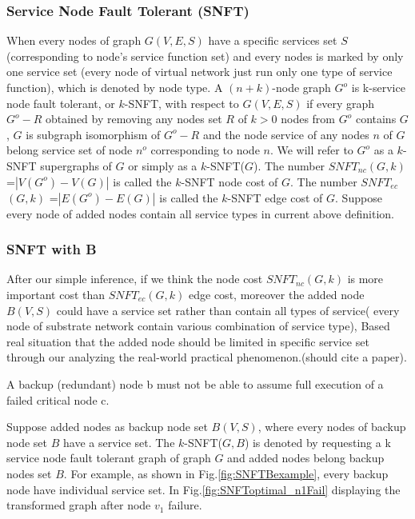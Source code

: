 \subsubsection{Service Node Fault Tolerant (SNFT)}
When every nodes of graph $G(V,E,S)$ have a specific services set $S$ (corresponding to node's service function set) and every nodes is marked by only one service set (every node of virtual network just run only one type of service function), which is denoted by node type. A $(n+k)$-node graph $G^o$ is k-service node fault tolerant, or $k$-SNFT, with respect to $G(V,E,S)$ if every graph $G^o-R$ obtained by removing any nodes set $R$ of $k>0$ nodes from $G^o$ contains $G$, $G$ is subgraph isomorphism of $G^o-R$ and the node service of any nodes $n$ of $G$ belong service set of node $n^o$ corresponding to node $n$. We will refer to $G^o$ as a $k$-SNFT supergraphs of $G$ or simply as a $k$-SNFT($G$). The number $SNFT_{nc}$$(G,k)$ =$|V(G^o)-V(G)|$ is called the $k$-SNFT node cost of $G$. The number $SNFT_{ec}$$(G,k)$ =$|E(G^o)-E(G)|$ is called the $k$-SNFT edge cost of $G$. Suppose every node of added nodes contain all service types in current above definition.
\subsubsection{SNFT with B}
After our simple inference, if we think the node cost $SNFT_{nc}(G,k)$  is more important cost than $SNFT_{ec}(G,k)$  edge cost, moreover the added node $B(V,S)$ could have a service set rather than contain all types of service( every node of substrate network contain various combination of service type), Based real situation that the added node should be limited in specific service set through our analyzing the real-world practical phenomenon.(should cite a paper).

A backup (redundant) node b must not be able to assume full execution of a failed critical node c.

Suppose added nodes as backup node set $B(V,S)$, where every nodes of backup node set $B$ have a service set. The $k$-SNFT($G,B$) is denoted by requesting a k service node fault tolerant graph of graph $G$ and added nodes belong backup nodes set $B$. For example, as shown in Fig.\ref{fig:SNFTBexample}, every backup node have individual service set. In Fig.\ref{fig:SNFToptimal_n1Fail} displaying the transformed graph after node $v_1$ failure.



